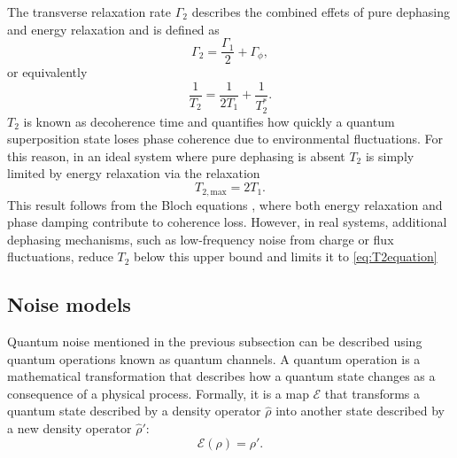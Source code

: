 The transverse relaxation rate $\Gamma_2$ describes the combined effets of pure dephasing and energy relaxation and is defined as 
\begin{equation}\label{eq:gamma2}
    \Gamma_2 = \frac{\Gamma_1}{2} + \Gamma_\phi,
\end{equation}
or equivalently
\begin{equation}\label{eq:T2equation}
    \frac{1}{T_2} = \frac{1}{2T_1} + \frac{1}{T_2^*}.
\end{equation}
$T_2$ is known as decoherence time and quantifies how quickly a quantum superposition state loses phase coherence due to environmental fluctuations. 
For this reason, in an ideal system where pure dephasing is absent $T_2$ is simply limited by energy relaxation via the relaxation\begin{equation}\label{eq:T2max}
    T_{2,\text{max}} = 2T_1.
\end{equation}
This result follows from the Bloch equations \cite{krantz_quantum_2019}, where both energy relaxation and phase damping contribute to coherence loss. 
However, in real systems, additional dephasing mechanisms, such as low-frequency noise from charge or flux fluctuations, reduce $T_2$ below this upper bound and limits it to \ref{eq:T2equation}

\subsection{Noise models}
Quantum noise mentioned in the previous subsection can be described using quantum operations known as quantum channels. 
A quantum operation is a mathematical transformation that describes how a quantum state changes as a consequence of a physical process. 
Formally, it is a map $\mathcal{E}$ that transforms a quantum state described by a density operator $\hat{\rho}$ into another state described by a new density operator $\hat{\rho}'$:
\begin{equation}
    \mathcal{E}(\rho) = \rho'\label{eq:quantum_map}.
\end{equation}

